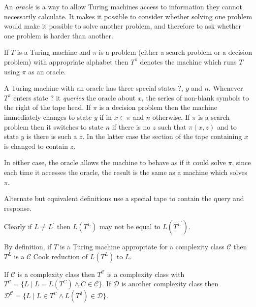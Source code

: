 \documentclass[12pt]{article}
\begin{document}
An \emph{oracle} is a way to allow Turing machines access to information they cannot necessarily calculate.  It makes it possible to consider whether solving one problem would make it possible to solve another problem, and therefore to ask whether one problem is harder than another.

If $T$ is a Turing machine and $\pi$ is a problem (either a search problem or a decision problem) with appropriate alphabet then $T^\pi$ denotes the machine which runs $T$ using $\pi$ as an oracle.

A Turing machine with an oracle has three special states $?$, $y$ and $n$.  Whenever $T^\pi$ enters state $?$ it \emph{queries} the oracle about $x$, the series of non-blank symbols to the right of the tape head.  If $\pi$ is a decision problem then the machine immediately changes to state $y$ if in $x\in\pi$ and $n$ otherwise.  If $\pi$ is a search problem then it switches to state $n$ if there is no $z$ such that $\pi(x,z)$ and to state $y$ is there is such a $z$.  In the latter case the section of the tape containing $x$ is changed to contain $z$.

In either case, the oracle allows the machine to behave as if it could solve $\pi$, since each time it accesses the oracle, the result is the same as a machine which solves $\pi$.

Alternate but equivalent definitions use a special tape to contain the query and response.

Clearly if $L\neq L^\prime$ then $L(T^L)$ may not be equal to $L(T^{L^\prime})$.

By definition, if $T$ is a Turing machine appropriate for a complexity class $\mathcal{C}$ then $T^L$ is a $\mathcal{C}$ Cook reduction of $L(T^L)$ to $L$.

If $\mathcal{C}$ is a complexity class then $T^\mathcal{C}$ is a complexity class with $T^\mathcal{C}=\{L\mid L=L(T^C)\wedge C\in \mathcal{C}\}$.  If $\mathcal{D}$ is another complexity class then $\mathcal{D}^\mathcal{C}=\{L\mid L\in T^\mathcal{C}\wedge L(T^\emptyset)\in\mathcal{D}\}$.
\end{document}
